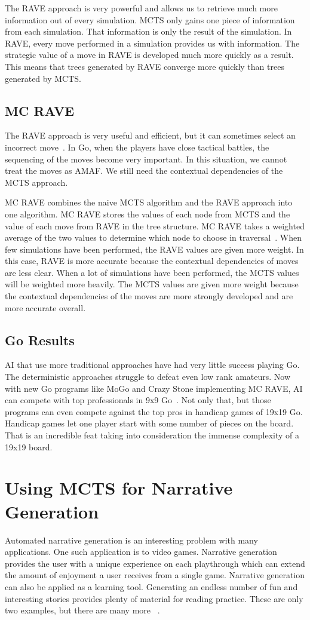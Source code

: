 \documentclass{sig-alternate}
\begin{document}
The RAVE approach is very powerful and allows us to retrieve much more information out of every simulation. MCTS only gains one piece of information from each simulation. That information is only the result of the simulation. In RAVE, every move performed in a simulation provides us with information. The strategic value of a move in RAVE is developed much more quickly as a result. This means that trees generated by RAVE converge more quickly than trees generated by MCTS.

\subsection{MC RAVE}
The RAVE approach is very useful and efficient, but it can sometimes select an incorrect move~\cite{RAVEinGo}. In Go, when the players have close tactical battles, the sequencing of the moves become very important. In this situation, we cannot treat the moves as AMAF. We still need the contextual dependencies of the MCTS approach.

MC RAVE combines the naive MCTS algorithm and the RAVE approach into one algorithm. MC RAVE stores the values of each node from MCTS and the value of each move from RAVE in the tree structure. MC RAVE takes a weighted average of the two values to determine which node to choose in traversal~\cite{RAVEinGo}. When few simulations have been performed, the RAVE values are given more weight. In this case, RAVE is more accurate because the contextual dependencies of moves are less clear. When a lot of simulations have been performed, the MCTS values will be weighted more heavily. The MCTS values are given more weight because the contextual dependencies of the moves are more strongly developed and are more accurate overall.
\subsection{Go Results}
AI that use more traditional approaches have had very little success playing Go. The deterministic approaches struggle to defeat even low rank amateurs. Now with new Go programs like MoGo and Crazy Stone implementing MC RAVE, AI can compete with top professionals in 9x9 Go~\cite{RAVEinGo}. Not only that, but those programs can even compete against the top pros in handicap games of 19x19 Go. Handicap games let one player start with some number of pieces on the board. That is an incredible feat taking into consideration the immense complexity of a 19x19 board.

\section{Using MCTS for Narrative Generation}
Automated narrative generation is an interesting problem with many applications. One such application is to video games. Narrative generation provides the user with a unique experience on each playthrough which can extend the amount of enjoyment a user receives from a single game. Narrative generation can also be applied as a learning tool. Generating an endless number of fun and interesting stories provides plenty of material for reading practice. These are only two examples, but there are many more ~\cite{Narrative}.
\end{document}

